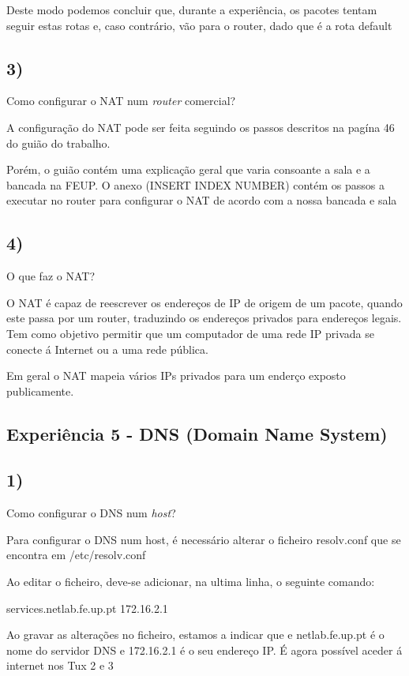 \documentclass[11pt]{article}
\begin{document}
Deste modo podemos concluir que, durante a experiência, os pacotes tentam seguir estas rotas e, caso contrário, vão para o router, dado que é a rota default
	


\subsection{3)} Como configurar o NAT num \emph{router} comercial?

A configuração do NAT pode ser feita seguindo os passos descritos na pagína 46 do guião do trabalho.

Porém, o guião contém uma explicação geral que varia consoante a sala e a bancada na FEUP. O anexo (INSERT INDEX NUMBER) contém os passos a executar no router para configurar o NAT de acordo com a nossa bancada e sala

\subsection{4)} O que faz o NAT?

O NAT é capaz de reescrever os endereços de IP de origem de um pacote, quando este passa por um router, traduzindo os endereços privados para endereços legais. Tem como objetivo permitir que um computador de uma rede IP privada se conecte á Internet ou a uma rede pública.

Em geral o NAT mapeia vários IPs privados para um enderço exposto publicamente.

\subsection{Experiência 5 - DNS (Domain Name System)}

\subsection{1)} Como configurar o DNS num \emph{host}?

Para configurar o DNS num host, é necessário alterar o ficheiro resolv.conf que se encontra em /etc/resolv.conf

Ao editar o ficheiro, deve-se adicionar, na ultima linha, o seguinte comando:

services.netlab.fe.up.pt 172.16.2.1

Ao gravar as alterações no ficheiro, estamos a indicar que e netlab.fe.up.pt é o nome do servidor DNS e 172.16.2.1 é o seu endereço IP. É agora possível aceder á internet nos Tux 2 e 3
\end{document}
